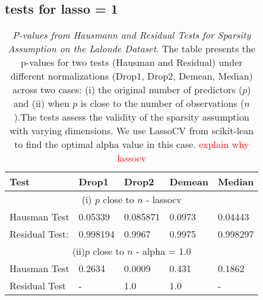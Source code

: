 \subsection{tests for lasso = 1 }
\begin{table}[h!]
\renewcommand{\arraystretch}{1.5}
\centering
\begin{tabular}{||l l l l l||} 
 \hline
 \hline
 Test & Drop1 & Drop2 &  Demean & Median \\ [0.5ex] 
 \hline \hline
 \multicolumn{5}{||c||}{(i)  $p$ close to $n$ - lassocv} \\ [0.5ex]
 Hausman Test & 0.05339 & 0.085871 & 0.0973 & 0.04443 \\ 
 Residual Test: & 0.998194 & 0.9967  & 0.9975 & 0.998297 \\ [1ex] 
 \hline
 \multicolumn{5}{||c||}{(ii)$p$ close to $n$ - alpha = 1.0} \\ [0.5ex]
 Hausman Test & 0.2634 & 0.0009 &  0.431 &  0.1862 \\ 
 Residual Test & - & 1.0 & 1.0 & - \\

 \hline \hline
\end{tabular}
\caption{\textit{P-values from Hausmann and Residual Tests for Sparsity Assumption on the Lalonde Dataset}. The table presents the p-values for two tests (Hausman and Residual) under different normalizations (Drop1, Drop2, Demean, Median) across two cases: (i) the original number of predictors ($p$) and (ii) when $p$ is close to the number of observations ($n$).The tests assess the validity of the sparsity assumption with varying dimensions. We use LassoCV from scikit-lean to find the optimal alpha value in this case. \textcolor{red}{explain why lassocv}}


\label{table:1}
\end{table}

